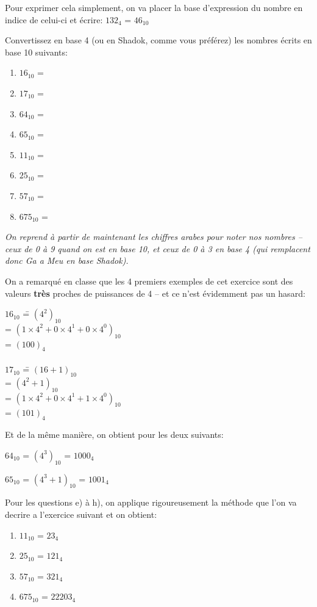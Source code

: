 \documentclass[12pt]{article}
\newenvironment{MaReponse}
		{\begin{greyedtextbox}\itshape} %
		{\end{greyedtextbox}}            %
\newenvironment{alphenum}
{\begin{enumerate}[label=\alph*.]}
	{\end{enumerate}}
\begin{document}
	Pour exprimer cela simplement, on va placer la base d'expression du nombre en indice de celui-ci et écrire: $132_4$ = $46_{10}$
	
	\begin{MonExo}
		Convertissez en base 4 (ou en Shadok, comme vous préférez) les nombres écrits en base 10 suivants:
		\begin{alphenum}
			\item $16_{10}$ =
			\item $17_{10}$ =
			\item $64_{10}$ =
			\item $65_{10}$ =
			\item $11_{10}$ =
			\item $25_{10}$ =
			\item $57_{10}$ =
			\item $675_{10}$ =
		\end{alphenum}
	\end{MonExo}
	
	\begin{MaReponse}
		On reprend à partir de maintenant les chiffres arabes pour noter nos nombres -- ceux de 0 à 9 quand on est en base 10, et ceux de 0 à 3 en base 4 (qui remplacent donc Ga a Meu en base Shadok).
		
		On a remarqué en classe que les 4 premiers exemples de cet exercice sont des valeurs \textbf{très} proches de puissances de 4 -- et ce n'est évidemment pas un hasard:
		\begin{tabbing}
			$16_{10}$ \==  $(4^{2})_{10}$ \\
			\>= $(1 \times 4^{2} + 0 \times 4^{1} + 0 \times 4^{0})_{10}$ \\
			\>= $(100)_{4}$
			\\ \\
			$17_{10}$ \==  $(16 + 1)_{10}$ \\
			\>=  $(4^{2} + 1)_{10}$ \\
			\>= $(1 \times 4^{2} + 0 \times 4^{1} + 1 \times 4^{0})_{10}$ \\
			\>= $(101)_{4}$
		\end{tabbing}
		Et de la même manière, on obtient pour les deux suivants:
		
		$64_{10}$ =  $(4^{3})_{10}$ =  $1000_{4}$
		
		$65_{10}$ =  $(4^{3} + 1)_{10}$ =  $1001_{4}$

		Pour les questions e) à h), on applique rigoureusement la méthode que l'on va decrire a l'exercice suivant et on obtient:
		\begin{enumerate}[label=\alph*.,start=5]
			\item $11_{10}$ = $23_4$
			\item $25_{10}$ = $121_4$
			\item $57_{10}$ = $321_4$
			\item $675_{10}$ = $22203_4$
		\end{enumerate}
	\end{MaReponse}
	
\end{document}
